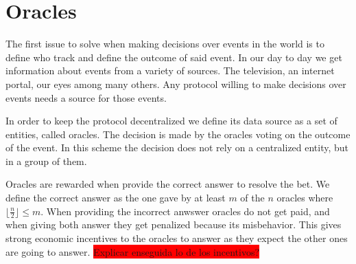 \section{Oracles}

The first issue to solve when making decisions over events in the world is to
  define who track and define the outcome of said event.
In our day to day we get information about events from a variety of sources. The
  television, an internet portal, our eyes among many others. Any protocol
  willing to make decisions over events needs a source for those events.

In order to keep the protocol decentralized we define its data source as a set
  of entities, called oracles. The decision is made by the oracles voting on
  the outcome of the event. In this scheme the decision does not rely on a
  centralized entity, but in a group of them.

Oracles are rewarded when provide the correct answer to resolve the bet.
We define the correct answer as the one gave by at least $m$ of the $n$ oracles
  where $\lfloor \frac{n}{2} \rfloor \leq m$.
When providing the incorrect anwswer oracles do not get paid, and when giving
  both answer they get penalized because its misbehavior. This gives strong
  economic incentives to the oracles to answer as they expect the other ones
  are going to answer. \colorbox{red}{Explicar enseguida lo de los incentivos?}
